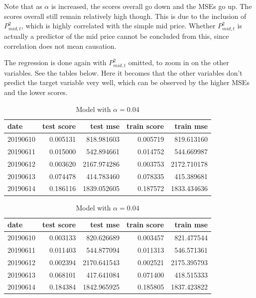 \documentclass[english, 11pt, a4paper]{article}
\begin{document}
Note that as $\alpha$ is increased, the scores overall go down and the MSEs go up. The scores
overall still remain relatively high though. This is due to the inclusion of  $P_{mid, t}^2$, which is highly correlated with the simple mid
price. Whether $P_{mid, t}^2$ is actually a predictor of the mid price cannot be concluded from
this, since correlation does not mean causation. 

The regression is done again with $P_{mid, t}^2$ omitted, to zoom in on the other variables. See the
tables below. Here it becomes that the other variables don't predict the target variable very well,
which can be observed by the higher MSEs and the lower scores.


\begin{table}[H]
  \centering
  \begin{minipage}{.6\textwidth}
    \centering
    \begin{tabular}{lrrrr}
    \toprule
    date & test score & test mse & train score & train mse \\
    \midrule
    20190610 & 0.005131 & 818.981603 & 0.005719 & 819.613160 \\
    20190611 & 0.015000 & 542.894661 & 0.014752 & 544.669987 \\
    20190612 & 0.003620 & 2167.974286 & 0.003753 & 2172.710178 \\
    20190613 & 0.074478 & 414.783460 & 0.078335 & 415.389681 \\
    20190614 & 0.186116 & 1839.052605 & 0.187572 & 1833.434636 \\
    \bottomrule
    \end{tabular}
    \caption{Model with $\alpha = 0.04$}
  \end{minipage}
  \begin{minipage}{.6\textwidth}
    \centering
    \begin{tabular}{lrrrr}
    \toprule
    date & test score & test mse & train score & train mse \\
    \midrule
    20190610 & 0.003133 & 820.626689 & 0.003457 & 821.477544 \\
    20190611 & 0.011403 & 544.877094 & 0.011313 & 546.571361 \\
    20190612 & 0.002394 & 2170.641543 & 0.002521 & 2175.395793 \\
    20190613 & 0.068101 & 417.641084 & 0.071400 & 418.515333 \\
    20190614 & 0.184384 & 1842.965925 & 0.185805 & 1837.423822 \\
    \bottomrule

\end{tabular}
\end{minipage}
\end{table}
\end{document}
